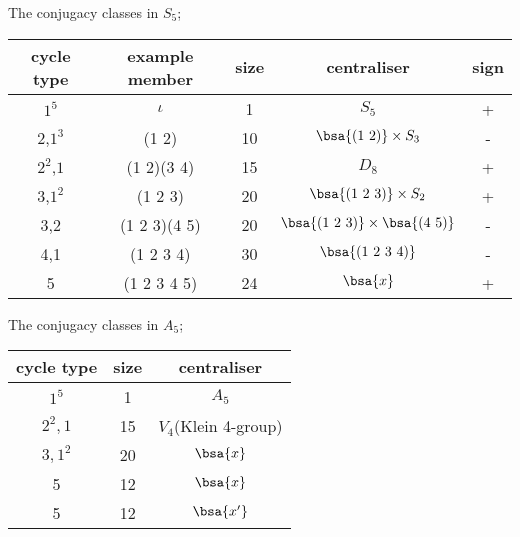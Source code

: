
\begin{example}
The conjugacy classes in $S_5$;

\begin{table}[h!]
\centering
\begin{tabular}{ccccc}
\hline
cycle type & example member & size & centraliser & sign\\
\hline
$1^5$ & $\iota$ & 1 & $S_5$ & +\\
2,$1^3$ & (1 2) & 10 & $\bsa{(1\ 2)}\times S_3$ & -\\
$2^2$,$1$ & (1 2)(3 4) & 15 & $D_8$ & +\\
3,$1^2$ & (1 2 3) & 20 & $\bsa{(1\ 2\ 3)}\times S_2$ & +\\
3,2 & (1 2 3)(4 5) & 20 & $\bsa{(1\ 2\ 3)}\times \bsa{(4\ 5)}$ & -\\
4,1 & (1 2 3 4) & 30 & $\bsa{(1\ 2\ 3\ 4)}$ & -\\
5 & (1 2 3 4 5) & 24 & $\bsa{x}$ & +\\
\hline
\end{tabular}
\end{table}

\end{example}

\begin{example}\label{exa:a_5}
The conjugacy classes in $A_5$;
\begin{table}[h!]
\centering
\begin{tabular}{ccc}
\hline
cycle type & size & centraliser\\
\hline
$1^5$ & 1 & $A_5$\\
$2^2,1$ & 15 & $V_4$(Klein 4-group)\\
$3,1^2$ & 20 & $\bsa{x}$\\
5 & 12 & $\bsa{x}$\\
5 & 12 & $\bsa{x'}$\\
\hline
\end{tabular}
\end{table}


\end{example}


